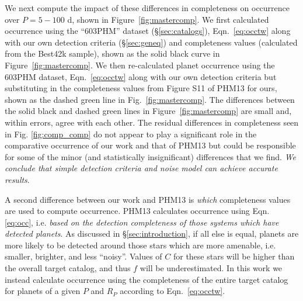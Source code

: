 We next compute the impact of these differences in completeness on
occurrence over $P=5-100$ d, shown in Figure~\ref{fig:mastercomp}. We first 
calculated occurrence using the ``603PHM'' dataset (\S\ref{sec:catalogs}),
Eqn.~\ref{eq:occtw} along with our own detection criteria (\S \ref{sec:geneq}) and completeness
values (calculated from the Best42k sample), shown as the solid black curve in
Figure~\ref{fig:mastercomp}. We then re-calculated planet occurrence
using the 603PHM dataset, Eqn.~\ref{eq:occtw} along with our own detection criteria
but substituting in the completeness values from Figure S11 of PHM13 for
ours, shown as the dashed green line in Fig.~\ref{fig:mastercomp}.
The differences between the solid black and dashed green lines in
Figure~\ref{fig:mastercomp} are small and, within errors, agree with
each other. The residual differences in completeness
seen in Fig. \ref{fig:comp_comp} do not appear to play a significant role in the
comparative occurrence of our work and that of PHM13 but could be
responsible for some of the minor (and statistically insignificant)
differences that we find. {\it We conclude that simple detection
criteria and noise model can achieve accurate results}.

A second difference between our work and PHM13 is {\it which}
completeness values are used to compute occurrence.  PHM13 calculates
occurrence using Eqn. \ref{eq:occ}, i.e. {\it based on the detection
completeness of those systems which have detected planets}.  As
discussed in \S \ref{sec:introduction}, if all else is equal,
planets are more likely to be detected around those stars which are
more amenable, i.e. smaller, brighter, and less ``noisy''.  Values of
$C$ for these stars will be higher than the overall target catalog,
and thus $f$ will be underestimated.  In this work we instead calculate 
occurrence using the completeness of the entire target catalog for 
planets of a given $P$ and $R_P$ according to Eqn.~\ref{eq:occtw}.  

